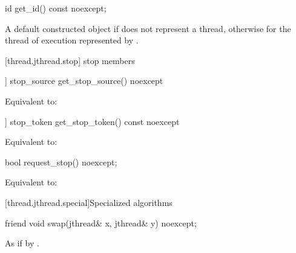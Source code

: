 %
\begin{itemdecl}
id get_id() const noexcept;
\end{itemdecl}

\begin{itemdescr}
\pnum
\returns A default constructed  object if  does not represent a thread,
otherwise  for the thread of execution represented by
.
\end{itemdescr}


{\color{diffcolor}
[thread.jthread.stop]{ stop members}

%
\begin{itemdecl}
[[nodiscard]] stop_source get_stop_source() noexcept
\end{itemdecl}
\begin{itemdescr}
  \pnum\effects Equivalent to: 
\end{itemdescr}

%
\begin{itemdecl}
[[nodiscard]] stop_token get_stop_token() const noexcept
\end{itemdecl}
\begin{itemdescr}
  \pnum\effects Equivalent to: 
\end{itemdescr}

%
\begin{itemdecl}
bool request_stop() noexcept;
\end{itemdecl}
\begin{itemdescr}
  \pnum\effects Equivalent to: 
\end{itemdescr}
}%


[thread.jthread.special]{Specialized algorithms}

{\color{diffcolor}
%
\begin{itemdecl}
friend void swap(jthread& x, jthread& y) noexcept;
\end{itemdecl}
}%

\begin{itemdescr}
\pnum\effects As if by .
\end{itemdescr}


